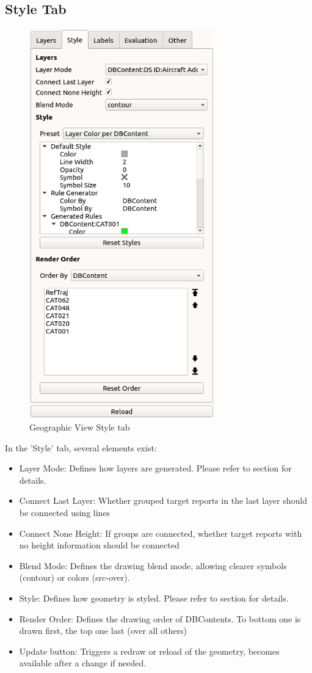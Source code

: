 \subsection{Style Tab}
\label{sec:geoview_style}

\begin{figure}[H]
   \center
    \includegraphics[width=8cm,frame]{figures/geoview_style_tab.png}
  \caption{Geographic View Style tab}
\end{figure}

In the 'Style' tab, several elements exist:

\begin{itemize}
 \item Layer Mode: Defines how layers are generated. Please refer to section  for details.
 \item Connect Last Layer: Whether grouped target reports in the last layer should be connected using lines
 \item Connect None Height: If groups are connected, whether target reports with no height information should be connected
 \item Blend Mode: Defines the drawing blend mode, allowing clearer symbols (contour) or colors (src-over).
 \item Style: Defines how geometry is styled. Please refer to section  for details.
 \item Render Order: Defines the drawing order of DBContents. To bottom one is drawn first, the top one last (over all others)
 \item Update button: Triggers a redraw or reload of the geometry, becomes available after a change if needed.
\end{itemize} 


